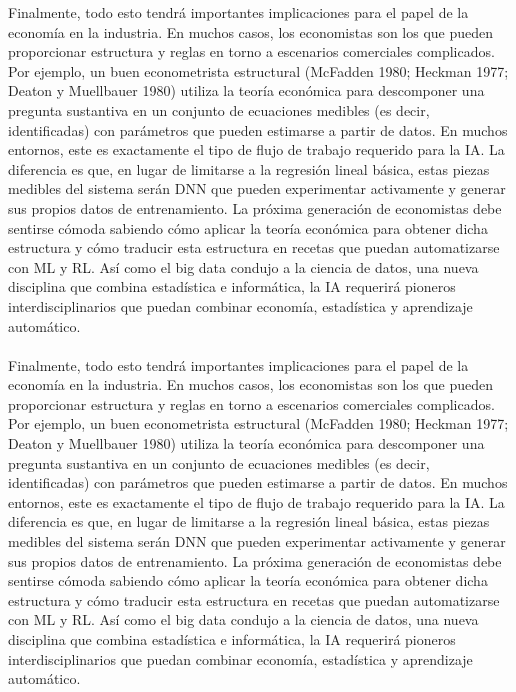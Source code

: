 Finalmente, todo esto tendrá importantes implicaciones para el papel de la economía en la industria. En muchos casos, los economistas son los que pueden proporcionar estructura y reglas en torno a escenarios comerciales complicados. Por ejemplo, un buen econometrista estructural (McFadden 1980; Heckman 1977; Deaton y Muellbauer 1980) utiliza la teoría económica para descomponer una pregunta sustantiva en un conjunto de ecuaciones medibles (es decir, identificadas) con parámetros que pueden estimarse a partir de datos. En muchos entornos, este es exactamente el tipo de flujo de trabajo requerido para la IA. La diferencia es que, en lugar de limitarse a la regresión lineal básica, estas piezas medibles del sistema serán DNN que pueden experimentar activamente y generar sus propios datos de entrenamiento. La próxima generación de economistas debe sentirse cómoda sabiendo cómo aplicar la teoría económica para obtener dicha estructura y cómo traducir esta estructura en recetas que puedan automatizarse con ML y RL. Así como el big data condujo a la ciencia de datos, una nueva disciplina que combina estadística e informática, la IA requerirá pioneros interdisciplinarios que puedan combinar economía, estadística y aprendizaje automático.\\
\\
Finalmente, todo esto tendrá importantes implicaciones para el papel de la economía en la industria. En muchos casos, los economistas son los que pueden proporcionar estructura y reglas en torno a escenarios comerciales complicados. Por ejemplo, un buen econometrista estructural (McFadden 1980; Heckman 1977; Deaton y Muellbauer 1980) utiliza la teoría económica para descomponer una pregunta sustantiva en un conjunto de ecuaciones medibles (es decir, identificadas) con parámetros que pueden estimarse a partir de datos. En muchos entornos, este es exactamente el tipo de flujo de trabajo requerido para la IA. La diferencia es que, en lugar de limitarse a la regresión lineal básica, estas piezas medibles del sistema serán DNN que pueden experimentar activamente y generar sus propios datos de entrenamiento. La próxima generación de economistas debe sentirse cómoda sabiendo cómo aplicar la teoría económica para obtener dicha estructura y cómo traducir esta estructura en recetas que puedan automatizarse con ML y RL. Así como el big data condujo a la ciencia de datos, una nueva disciplina que combina estadística e informática, la IA requerirá pioneros interdisciplinarios que puedan combinar economía, estadística y aprendizaje automático.\\



